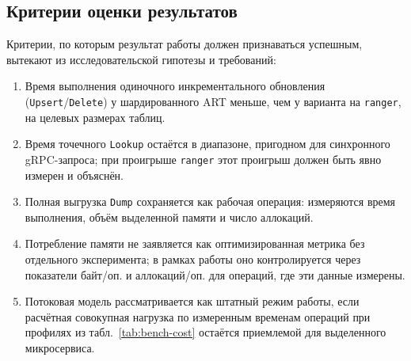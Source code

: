\subsection{Критерии оценки результатов}

Критерии, по которым результат работы должен признаваться успешным,
вытекают из исследовательской гипотезы и требований:

\begin{enumerate}
\item Время выполнения одиночного инкрементального обновления
(\texttt{Upsert}/\texttt{Delete}) у шардированного ART меньше, чем у
варианта на \texttt{ranger}, на целевых размерах таблиц.
\item Время точечного \texttt{Lookup} остаётся в диапазоне, пригодном для
синхронного gRPC-запроса; при проигрыше \texttt{ranger} этот проигрыш
должен быть явно измерен и объяснён.
\item Полная выгрузка \texttt{Dump} сохраняется как рабочая операция:
измеряются время выполнения, объём выделенной памяти и число аллокаций.
\item Потребление памяти не заявляется как оптимизированная метрика без
отдельного эксперимента; в рамках работы оно контролируется через
показатели байт/оп. и аллокаций/оп. для операций, где эти данные измерены.
\item Потоковая модель рассматривается как штатный режим работы, если
расчётная совокупная нагрузка по измеренным временам операций при
профилях из табл.~\ref{tab:bench-cost} остаётся приемлемой для
выделенного микросервиса.
\end{enumerate}

